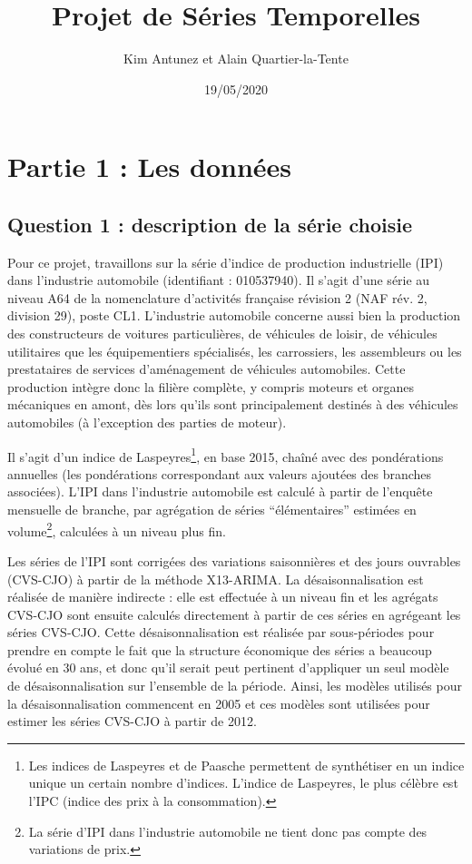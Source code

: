 \documentclass[,french]{article}
\title{Projet de Séries Temporelles}
\author{Kim Antunez et Alain Quartier-la-Tente}
\date{19/05/2020}
\let\rmarkdownfootnote\footnote%
\def\footnote{\protect\rmarkdownfootnote}
\begin{document}
\maketitle

{
\hypersetup{linkcolor=}
\setcounter{tocdepth}{3}
\tableofcontents
}
\thispagestyle{empty}
\newpage\setcounter{page}{1}

\hypertarget{partie-1-les-donnuxe9es}{%
\section{Partie 1 : Les données}\label{partie-1-les-donnuxe9es}}

\hypertarget{question-1-description-de-la-suxe9rie-choisie}{%
\subsection{Question 1 : description de la série choisie}\label{question-1-description-de-la-suxe9rie-choisie}}

Pour ce projet, travaillons sur la série d'indice de production industrielle (IPI) dans l'industrie automobile (identifiant : 010537940).
Il s'agit d'une série au niveau A64 de la nomenclature d'activités française révision 2 (NAF rév. 2, division 29), poste CL1.
L'industrie automobile concerne aussi bien la production des constructeurs de voitures particulières, de véhicules de loisir, de véhicules utilitaires que les équipementiers spécialisés, les carrossiers, les assembleurs ou les prestataires de services d'aménagement de véhicules automobiles.
Cette production intègre donc la filière complète, y compris moteurs et organes mécaniques en amont, dès lors qu'ils sont principalement destinés à des véhicules automobiles (à l'exception des parties de moteur).

Il s'agit d'un indice de Laspeyres\footnote{Les indices de Laspeyres et de Paasche permettent de synthétiser en un indice unique un certain nombre d'indices. L'indice de Laspeyres, le plus célèbre est l'IPC (indice des prix à la consommation).}, en base 2015, chaîné avec des pondérations annuelles (les pondérations correspondant aux valeurs ajoutées des branches associées).
L'IPI dans l'industrie automobile est calculé à partir de l'enquête mensuelle de branche, par agrégation de séries ``élémentaires'' estimées en volume\footnote{La série d'IPI dans l'industrie automobile ne tient donc pas compte des variations de prix.}, calculées à un niveau plus fin.

Les séries de l'IPI sont corrigées des variations saisonnières et des jours ouvrables (CVS-CJO) à partir de la méthode X13-ARIMA.
La désaisonnalisation est réalisée de manière indirecte : elle est effectuée à un niveau fin et les agrégats CVS-CJO sont ensuite calculés directement à partir de ces séries en agrégeant les séries CVS-CJO.
Cette désaisonnalisation est réalisée par sous-périodes pour prendre en compte le fait que la structure économique des séries a beaucoup évolué en 30 ans, et donc qu'il serait peut pertinent d'appliquer un seul modèle de désaisonnalisation sur l'ensemble de la période.
Ainsi, les modèles utilisés pour la désaisonnalisation commencent en 2005 et ces modèles sont utilisées pour estimer les séries CVS-CJO à partir de 2012.
\end{document}
